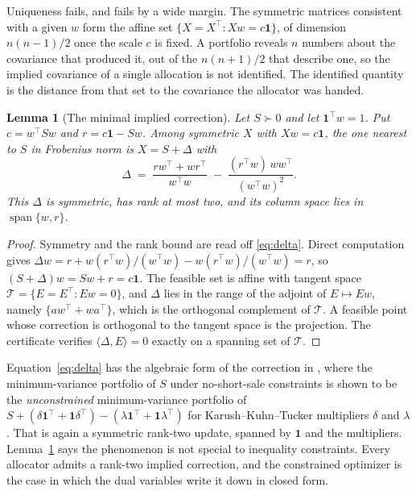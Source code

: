 \documentclass[11pt]{article}
\newtheorem{lemma}{Lemma}
\theoremstyle{remark}
\begin{document}
Uniqueness fails, and fails by a wide margin. The symmetric matrices
consistent with a given $w$ form the affine set
$\{X = X^\top : Xw = c\mathbf{1}\}$, of dimension $n(n-1)/2$ once the scale
$c$ is fixed. A portfolio reveals $n$ numbers about the covariance that
produced it, out of the $n(n+1)/2$ that describe one, so the implied
covariance of a single allocation is not identified. The identified quantity
is the distance from that set to the covariance the allocator was handed.

\begin{lemma}[The minimal implied correction]
\label{lem:minimal}
Let $S \succ 0$ and let $\mathbf{1}^\top w = 1$. Put $c = w^\top S w$ and
$r = c\mathbf{1} - Sw$. Among symmetric $X$ with $Xw = c\mathbf{1}$, the one
nearest to $S$ in Frobenius norm is $X = S + \Delta$ with
\begin{equation}
\Delta \;=\; \frac{rw^\top + wr^\top}{w^\top w}
  \;-\; \frac{(r^\top w)\,ww^\top}{(w^\top w)^2}.
\label{eq:delta}
\end{equation}
This $\Delta$ is symmetric, has rank at most two, and its column space lies
in $\operatorname{span}\{w, r\}$.
\end{lemma}

\begin{proof}
Symmetry and the rank bound are read off \eqref{eq:delta}. Direct
computation gives $\Delta w = r + w(r^\top w)/(w^\top w) - w(r^\top
w)/(w^\top w) = r$, so $(S + \Delta)w = Sw + r = c\mathbf{1}$. The feasible
set is affine with tangent space $\mathcal{T} = \{E = E^\top : Ew = 0\}$,
and $\Delta$ lies in the range of the adjoint of $E \mapsto Ew$, namely
$\{aw^\top + wa^\top\}$, which is the orthogonal complement of
$\mathcal{T}$. A feasible point whose correction is orthogonal to the
tangent space is the projection. The certificate verifies
$\langle \Delta, E\rangle = 0$ exactly on a spanning set of $\mathcal{T}$.
\end{proof}

Equation~\eqref{eq:delta} has the algebraic form of the correction in
\cite{jagannathanma2003}, where the minimum-variance portfolio of $S$ under
no-short-sale constraints is shown to be the \emph{unconstrained}
minimum-variance portfolio of $S + (\delta\mathbf{1}^\top +
\mathbf{1}\delta^\top) - (\lambda\mathbf{1}^\top + \mathbf{1}\lambda^\top)$
for Karush--Kuhn--Tucker multipliers $\delta$ and $\lambda$. That is again a
symmetric rank-two update, spanned by $\mathbf{1}$ and the multipliers.
Lemma~\ref{lem:minimal} says the phenomenon is not special to inequality
constraints. Every allocator admits a rank-two implied correction, and the
constrained optimizer is the case in which the dual variables write it down
in closed form.
\end{document}
